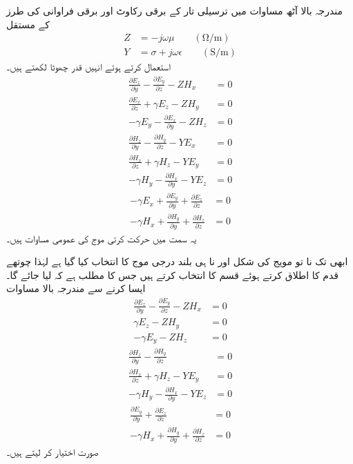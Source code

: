 مندرجہ بالا آٹھ مساوات میں ترسیلی تار کے برقی رکاوٹ  اور برقی فراوانی  کی طرز کے مستقل
\begin{align}\label{مساوت_مویج_رکاوٹ_فراوانی}
Z&=-j \omega \mu  \quad \quad \left(\si{\ohm / \meter} \right) \\
Y&=\sigma +j \omega \epsilon \quad \quad \left(\si{\siemens / \meter} \right)
\end{align}
استعمال کرتے ہوئے انہیں قدر چھوٹا لکھتے ہیں۔
\begin{align}
\frac{\partial E_z}{\partial y}-\frac{\partial E_y}{\partial z}-Z H_x&=0  \\
\frac{\partial E_x}{\partial z}+\gamma E_z-Z H_y&=0  \\
-\gamma E_y-\frac{\partial E_x}{\partial y}-Z H_z&=0
\end{align}
%
\begin{align}
\frac{\partial H_z}{\partial y}-\frac{\partial H_y}{\partial z}-YE_x&=0 \\
\frac{\partial H_x}{\partial z}+\gamma H_z-YE_y&=0  \\
-\gamma H_y-\frac{\partial H_x}{\partial y}-YE_z&=0 
\end{align}
%
\begin{align}
-\gamma E_x+\frac{\partial E_y}{\partial y}+\frac{\partial E_z}{\partial z}&=0 \\
-\gamma H_x+\frac{\partial H_y}{\partial y}+\frac{\partial H_z}{\partial z}&=0 \label{مساوات_مویج_مستطیلی_تیسرا_قدم_ختم}
\end{align}
 یہ  سمت میں حرکت کرتی موج کی عمومی مساوات ہیں۔

ابھی تک نا تو مویج کی شکل اور نا ہی بلند درجی موج  کا انتخاب کیا گیا ہے لہٰذا چوتھے قدم کا اطلاق کرتے ہوئے  قسم کا انتخاب کرتے ہیں جس کا مطلب ہے کہ  لیا جائے گا۔ایسا کرنے سے مندرجہ بالا مساوات   
\begin{align}
\frac{\partial E_z}{\partial y}-\frac{\partial E_y}{\partial z}-Z H_x&=0  \label{مساوات_مویج_الف}\\
\gamma E_z-Z H_y&=0  \label{مساوات_مویج_ب}\\
-\gamma E_y-Z H_z&=0\label{مساوات_مویج_پ}
\end{align}
%
\begin{align}
\frac{\partial H_z}{\partial y}-\frac{\partial H_y}{\partial z}&=0 \label{مساوات_مویج_ت}\\
\frac{\partial H_x}{\partial z}+\gamma H_z-YE_y&=0  \label{مساوات_مویج_ٹ}\\
-\gamma H_y-\frac{\partial H_x}{\partial y}-YE_z&=0 \label{مساوات_مویج_ث}
\end{align}
%
\begin{align}
\frac{\partial E_y}{\partial y}+\frac{\partial E_z}{\partial z}&=0 \label{مساوات_مویج_ج}\\
-\gamma H_x+\frac{\partial H_y}{\partial y}+\frac{\partial H_z}{\partial z}&=0\label{مساوات_مویج_چ}
\end{align}
صورت اختیار کر لیتے ہیں۔

